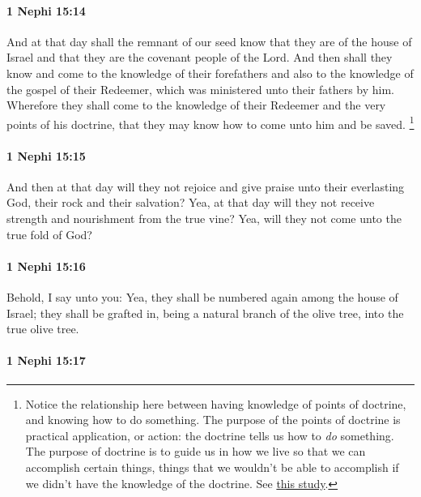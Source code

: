 		\paragraph{1 Nephi 15:14} %
			\label{1NEPHI-15-14}

			And at that day shall the remnant of our seed know
			that they are of the house of Israel
			and that they are the covenant people of the Lord.
			And then shall they know and come to the knowledge of their forefathers
			and also to the knowledge of the gospel of their Redeemer,
			which was ministered unto their fathers by him.
			Wherefore they shall come to the knowledge of their Redeemer
			and the very points of his doctrine,
			that they may know how to come unto him and be saved.%
				\footnote{%
					\label{1NEPHI-15-14-NOTE-how}%
					Notice the relationship here between having knowledge of points of doctrine, and knowing how to do something. The purpose of the points of doctrine is practical application, or action: the doctrine tells us how to \textit{do} something. The purpose of doctrine is to guide us in how we live so that we can accomplish certain things, things that we wouldn't be able to accomplish if we didn't have the knowledge of the doctrine. See \hyperref[REPENTANCE-learning]{this study}.
					}

		\paragraph{1 Nephi 15:15} %
			\label{1NEPHI-15-15}

			And then at that day will they not rejoice
			and give praise unto their everlasting God, their rock and their salvation?
			Yea, at that day will they not receive strength and nourishment from the true vine?
			Yea, will they not come unto the true fold of God?

		\paragraph{1 Nephi 15:16} %
			\label{1NEPHI-15-16}

			Behold, I say unto you:
			Yea, they shall be numbered again among the house of Israel;
			they shall be grafted in,
			being a natural branch of the olive tree,
			into the true olive tree.

		\paragraph{1 Nephi 15:17} %
			\label{1NEPHI-15-17}

